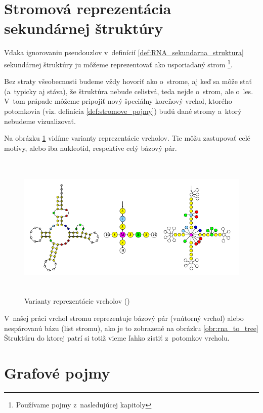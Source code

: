 \section{Stromová reprezentácia sekundárnej štruktúry}

Vďaka ignorovaniu pseudouzlov v~definícií \ref{def:RNA_sekundarna_struktura} sekundárnej
štruktúry ju môžeme reprezentovať ako usporiadaný strom
\footnote{Používame pojmy z~nasledujúcej kapitoly }.

Bez straty všeobecnosti budeme vždy hovoriť ako o~strome, aj keď sa môže stať
(a~typicky aj stáva), že štruktúra nebude celistvá, teda nejde o~strom, ale o~les.
V~tom prápade môžeme pripojiť nový špeciálny koreňový vrchol, ktorého potomkovia
(viz. definícia \ref{def:stromove_pojmy}) budú dané stromy a~ktorý nebudeme vizualizovať.

Na obrázku \ref{obr:RNA_stromova_reprezentacia} vidíme varianty reprezentácie vrcholov.
Tie môžu zastupovať celé motívy, alebo iba nukleotid, respektíve celý bázový pár.

\begin{figure}
  \centering
  \includegraphics[width=130mm, height=70mm]{../img/stromova_reprezentacia_rna}
  \caption{Varianty reprezentácie vrcholov (\citet{RNA_DRAW})}
  \label{obr:RNA_stromova_reprezentacia}
\end{figure}

V~našej práci vrchol stromu reprezentuje bázový pár (vnútorný vrchol)
alebo nespárovanú bázu (list stromu), ako je to zobrazené na obrázku \ref{obr:rna_to_tree}
Štruktúru do ktorej patrí si totiž vieme ľahko zistiť z~potomkov vrcholu.






\section{Grafové pojmy}
\label{kap:grafy}

